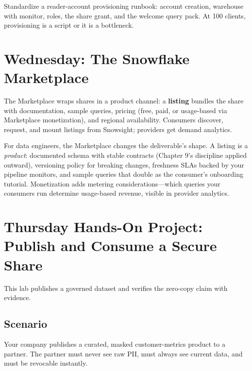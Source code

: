 \begin{tipbox}
Standardize a reader-account provisioning runbook: account creation, warehouse with monitor, roles, the share grant, and the welcome query pack. At 100 clients, provisioning is a script or it is a bottleneck.
\end{tipbox}

\section{Wednesday: The Snowflake Marketplace}
The Marketplace wraps shares in a product channel: a \textbf{listing} bundles the share with documentation, sample queries, pricing (free, paid, or usage-based via Marketplace monetization), and regional availability. Consumers discover, request, and mount listings from Snowsight; providers get demand analytics.

For data engineers, the Marketplace changes the deliverable's shape. A listing is a \emph{product}: documented schema with stable contracts (Chapter 9's discipline applied outward), versioning policy for breaking changes, freshness SLAs backed by your pipeline monitors, and sample queries that double as the consumer's onboarding tutorial. Monetization adds metering considerations---which queries your consumers run determine usage-based revenue, visible in provider analytics.

\section{Thursday Hands-On Project: Publish and Consume a Secure Share}
This lab publishes a governed dataset and verifies the zero-copy claim with evidence.

\subsection*{Scenario}
Your company publishes a curated, masked customer-metrics product to a partner. The partner must never see raw PII, must always see current data, and must be revocable instantly.

